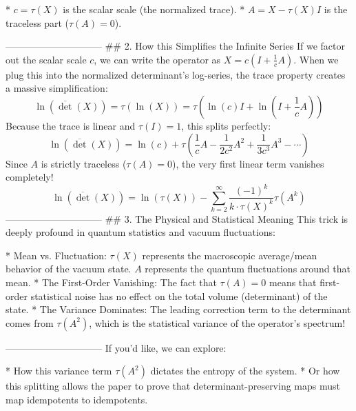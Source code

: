 * $c = \tau(X)$ is the scalar scale (the normalized trace).
* $A = X - \tau(X)I$ is the traceless part ($\tau(A) = 0$).

------------------------------
## 2. How this Simplifies the Infinite Series
If we factor out the scalar scale $c$, we can write the operator as $X = c\left(I + \frac{1}{c}A\right)$. When we plug this into the normalized determinant's log-series, the trace property creates a massive simplification:
$$\ln(\overline{\det}(X)) = \tau(\ln(X)) = \tau\left( \ln(c)I + \ln\left(I + \frac{1}{c}A\right) \right)$$ 
Because the trace is linear and $\tau(I) = 1$, this splits perfectly:
$$\ln(\overline{\det}(X)) = \ln(c) + \tau\left( \frac{1}{c}A - \frac{1}{2c^2}A^2 + \frac{1}{3c^3}A^3 - \cdots \right)$$ 
Since $A$ is strictly traceless ($\tau(A) = 0$), the very first linear term vanishes completely!
$$\ln(\overline{\det}(X)) = \ln(\tau(X)) - \sum_{k=2}^{\infty} \frac{(-1)^k}{k \cdot \tau(X)^k} \tau(A^k)$$ 
------------------------------
## 3. The Physical and Statistical Meaning
This trick is deeply profound in quantum statistics and vacuum fluctuations:

* Mean vs. Fluctuation: $\tau(X)$ represents the macroscopic average/mean behavior of the vacuum state. $A$ represents the quantum fluctuations around that mean.
* The First-Order Vanishing: The fact that $\tau(A) = 0$ means that first-order statistical noise has no effect on the total volume (determinant) of the state.
* The Variance Dominates: The leading correction term to the determinant comes from $\tau(A^2)$, which is the statistical variance of the operator's spectrum!

------------------------------
If you'd like, we can explore:

* How this variance term $\tau(A^2)$ dictates the entropy of the system.
* Or how this splitting allows the paper to prove that determinant-preserving maps must map idempotents to idempotents.


